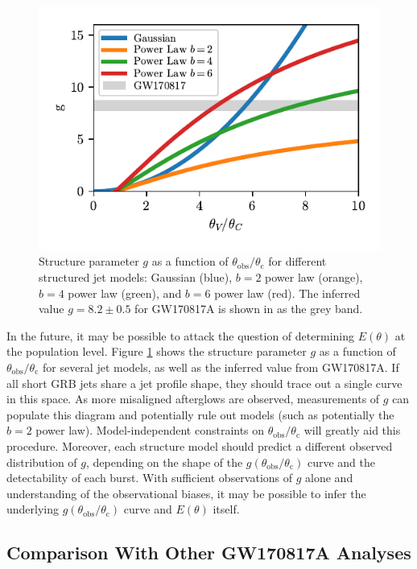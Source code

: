 \documentclass[twocolumn]{aastex62}
\newcommand{\gwbns}{GW170817A}
\newcommand{\thobs}{\ensuremath{\theta_{\mathrm{obs}}}}
\newcommand{\thC}{\ensuremath{\theta_{\mathrm{c}}}}
\begin{document}
\begin{figure}
	\includegraphics[width=\columnwidth]{figs/g_plot.pdf}
	\caption{Structure parameter $g$ as a function of $\thobs/\thC$ for different structured jet models: Gaussian (blue), $b=2$ power law (orange), $b=4$ power law (green), and $b=6$ power law (red).  The inferred value $g = 8.2\pm0.5$ for \gwbns{} is shown in as the grey band. \label{fig:gPop}}
\end{figure}

In the future, it may be possible to attack the question of determining $E(\theta)$ at the population level.  Figure \ref{fig:gPop} shows the structure parameter $g$ as a function of $\thobs/\thC$ for several jet models, as well as the inferred value from \gwbns{}.  If all short GRB jets share a jet profile shape, they should trace out a single curve in this space.  As more misaligned afterglows are observed, measurements of $g$ can populate this diagram and potentially rule out models (such as potentially the $b=2$ power law).  Model-independent constraints on $\thobs/\thC$ will greatly aid this procedure.  Moreover, each structure model should predict a different observed distribution of $g$, depending on the shape of the $g(\thobs/\thC)$ curve and the detectability of each burst.  With sufficient observations of $g$ alone and understanding of the observational biases, it may be possible to infer the underlying $g(\thobs/\thC)$ curve and $E(\theta)$ itself.

\subsection{Comparison With Other \gwbns{} Analyses}
\end{document}
